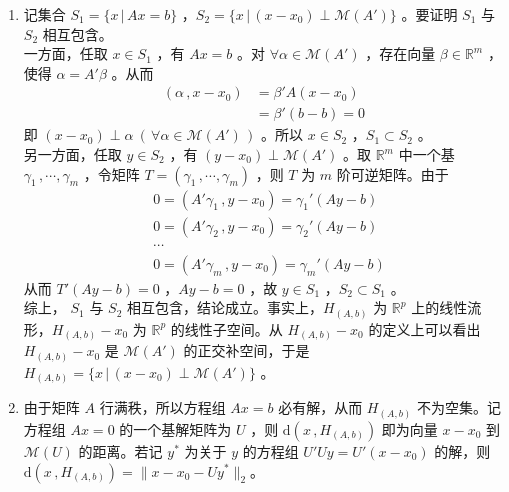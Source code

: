 \documentclass[12pt,hyperref,]{ctexart}
\begin{document}
\begin{enumerate}
\def\labelenumi{(\roman{enumi})}
\item
  记集合 \(S_1=\{x\, |\, Ax=b\}\)
  ，\(S_2=\{x\, |\, (x-x_0) \perp \mathcal{M}(A')\}\) 。要证明 \(S_1\)
  与 \(S_2\) 相互包含。\\
  一方面，任取 \(x\in S_1\) ，有 \(Ax=b\) 。对
  \(\forall \alpha \in \mathcal{M}(A')\) ，存在向量
  \(\beta \in \mathbb{R}^m\) ，使得 \(\alpha =A'\beta\) 。从而
  \begin{equation*}
  \begin{aligned}
  (\alpha \, ,x-x_0) & = \beta'A(x-x_0) \\
  & = \beta'(b-b) =0
  \end{aligned}
  \end{equation*}即
  \((x-x_0)\perp \alpha \ (\, \forall \alpha \in \mathcal{M}(A')\, )\)
  。所以 \(x \in S_2\) ，\(S_1 \subset S_2\) 。\\
  另一方面，任取 \(y \in S_2\) ，有 \((y-x_0)\perp \mathcal{M}(A')\)
  。取 \(\mathbb{R}^m\) 中一个基 \(\gamma_1\, ,\cdots ,\gamma_m\)
  ，令矩阵 \(T=(\gamma_1\, ,\cdots ,\gamma_m)\) ，则 \(T\) 为 \(m\)
  阶可逆矩阵。由于 \begin{equation*}
  \begin{aligned}
  & 0=(A'\gamma_1 \, ,y-x_0)=\gamma_1' (Ay-b) \\
  & 0=(A'\gamma_2 \, ,y-x_0)=\gamma_2' (Ay-b) \\
  & \cdots \\
  & 0=(A'\gamma_m \, ,y-x_0)=\gamma_m' (Ay-b)
  \end{aligned}
  \end{equation*}从而 \(T'(Ay-b)=0\) ，\(Ay-b=0\) ，故 \(y\in S_1\)
  ，\(S_2 \subset S_1\) 。\\
  综上， \(S_1\) 与 \(S_2\) 相互包含，结论成立。事实上，\(H_{(A,b)}\) 为
  \(\mathbb{R}^p\) 上的线性流形，\(H_{(A,b)}-x_0\) 为 \(\mathbb{R}^p\)
  的线性子空间。从 \(H_{(A,b)}-x_0\) 的定义上可以看出 \(H_{(A,b)}-x_0\)
  是 \(\mathcal{M}(A')\) 的正交补空间，于是
  \(H_{(A,b)}=\{x\, |\, (x-x_0) \perp \mathcal{M}(A')\}\) 。
\item
  由于矩阵 \(A\) 行满秩，所以方程组 \(Ax=b\) 必有解，从而 \(H_{(A,b)}\)
  不为空集。记方程组 \(Ax=0\) 的一个基解矩阵为 \(U\) ，则
  \(\mathrm{d}(x\, ,H_{(A,b)})\) 即为向量 \(x-x_0\) 到
  \(\mathcal{M}(U)\) 的距离。若记 \(y^*\) 为关于 \(y\) 的方程组
  \(U'Uy=U'(x-x_0)\) 的解，则
  \(\mathrm{d}(x\, ,H_{(A,b)})=\rVert x-x_0-Uy^*\rVert_2\)。
\end{enumerate}
\end{document}
